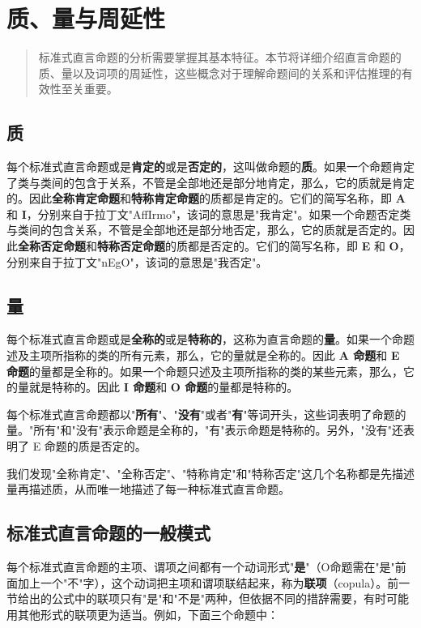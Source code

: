 \section{质、量与周延性}

\begin{quotation}
标准式直言命题的分析需要掌握其基本特征。本节将详细介绍直言命题的质、量以及词项的周延性，这些概念对于理解命题间的关系和评估推理的有效性至关重要。
\end{quotation}

\subsection{质}
每个标准式直言命题或是\textbf{肯定的}或是\textbf{否定的}，这叫做命题的\textbf{质}。如果一个命题肯定了类与类间的包含于关系，不管是全部地还是部分地肯定，那么，它的质就是肯定的。因此\textbf{全称肯定命题}和\textbf{特称肯定命题}的质都是肯定的。它们的简写名称，即 \textbf{A} 和 \textbf{I}，分别来自于拉丁文"AffIrmo"，该词的意思是"我肯定"。如果一个命题否定类与类间的包含关系，不管是全部地还是部分地否定，那么，它的质就是否定的。因此\textbf{全称否定命题}和\textbf{特称否定命题}的质都是否定的。它们的简写名称，即 \textbf{E} 和 \textbf{O}，分别来自于拉丁文"nEgO"，该词的意思是"我否定"。

\subsection{量}
每个标准式直言命题或是\textbf{全称的}或是\textbf{特称的}，这称为直言命题的\textbf{量}。如果一个命题述及主项所指称的类的所有元素，那么，它的量就是全称的。因此 \textbf{A 命题}和 \textbf{E 命题}的量都是全称的。如果一个命题只述及主项所指称的类的某些元素，那么，它的量就是特称的。因此 \textbf{I 命题}和 \textbf{O 命题}的量都是特称的。

每个标准式直言命题都以"\textbf{所有}"、"\textbf{没有}"或者"\textbf{有}"等词开头，这些词表明了命题的量。"所有"和"没有"表示命题是全称的，"有"表示命题是特称的。另外，"没有"还表明了 E 命题的质是否定的。

我们发现"全称肯定"、"全称否定"、"特称肯定"和"特称否定"这几个名称都是先描述量再描述质，从而唯一地描述了每一种标准式直言命题。

\subsection{标准式直言命题的一般模式}
每个标准式直言命题的主项、谓项之间都有一个动词形式"\textbf{是}"（O命题需在"是"前面加上一个"不"字），这个动词把主项和谓项联结起来，称为\textbf{联项}（copula）。前一节给出的公式中的联项只有"是"和"不是"两种，但依据不同的措辞需要，有时可能用其他形式的联项更为适当。例如，下面三个命题中：

